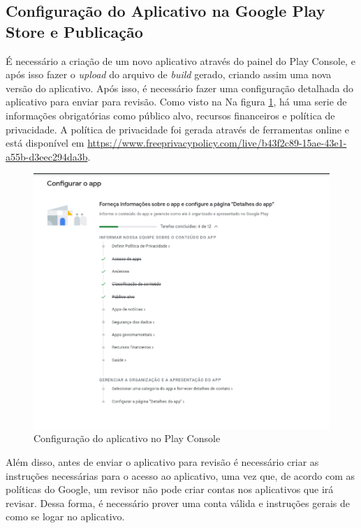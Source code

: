 \subsection{Configuração do Aplicativo na Google Play Store e Publicação}
É necessário a criação de um novo aplicativo através do painel do Play Console, e após isso fazer o \textit{upload} do arquivo de \textit{build} gerado, criando assim uma nova versão do aplicativo.
Após isso, é necessário fazer uma configuração detalhada do aplicativo para enviar para revisão. Como visto na Na figura \ref{app-conf}, há uma serie de informações obrigatórias como público alvo, recursos financeiros e política de privacidade. A política de privacidade foi gerada através de ferramentas online e está disponível em \url{https://www.freeprivacypolicy.com/live/b43f2c89-15ae-43e1-a55b-d3eec294da3b}.


\begin{figure}[h]
	\centering
\includegraphics[keepaspectratio=true,scale=0.35]{figuras/app-conf.png}
	\caption{Configuração do aplicativo no Play Console}
	\label{app-conf}
\end{figure}


Além disso, antes de enviar o aplicativo para revisão é necessário criar as instruções necessárias para o acesso ao aplicativo, uma vez que, de acordo com as políticas do Google, um revisor não pode criar contas nos aplicativos que irá revisar. Dessa forma, é necessário prover uma conta válida e instruções gerais de como se logar no aplicativo. 

